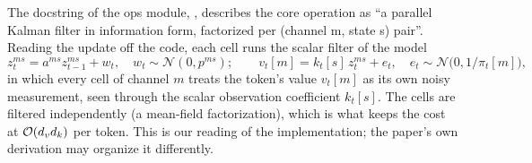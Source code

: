 The docstring of the ops module,
, describes the core
operation as ``a parallel Kalman filter in information form, factorized per (channel m, state s)
pair''.
Reading the update off the code, each cell runs the scalar filter of the model
\begin{equation}\label{eq:c08-kla-model}
  z_t^{ms} = a^{ms}z_{t-1}^{ms}+w_t,\quad w_t\sim\mathcal{N}(0,p^{ms});\qquad
  v_t[m] = k_t[s]\,z_t^{ms}+e_t,\quad e_t\sim\mathcal{N}\bigl(0,1/\pi_t[m]\bigr),
\end{equation}
in which every cell of channel $m$ treats the token's value $v_t[m]$ as its own noisy measurement,
seen through the scalar observation coefficient $k_t[s]$. The cells are filtered independently (a
mean-field factorization), which is what keeps the cost at $\mathcal{O}(d_vd_k)$ per token. This is our
reading of the implementation; the paper's own derivation may organize it differently.

